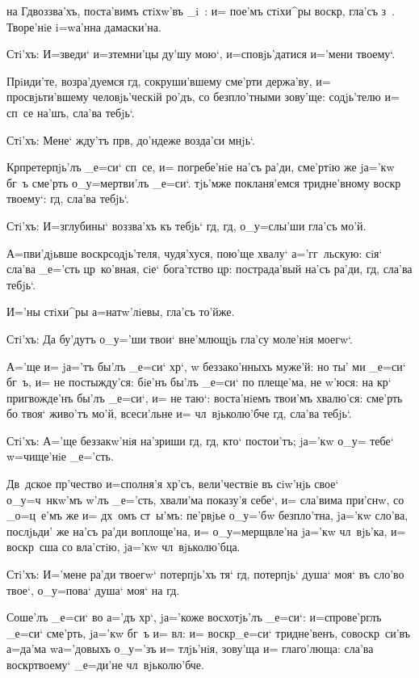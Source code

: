 
на Гд воззва'хъ, поста'вимъ стiхw'въ _i~: и= пое'мъ 
стiхи^ры воскр, гла'съ з~. Творе'нiе i=wа'нна 
дамаски'на.

Стi'хъ: И=зведи` и=з\ъ темни'цы ду'шу мою`, 
и=сповjь'датися и='мени твоему`.

Прiиди'те, возра'дуемся гд, сокруши'вшему сме'рти 
держа'ву, и= просвjьти'вшему человjь'ческiй ро'дъ, со 
безпло'тными зову'ще: содjь'телю и= сп~се на'шъ, сла'ва 
тебjь`.

Стi'хъ: Мене` жду'тъ прв, до'ндеже возда'си 
мнjь`.

Кр претерпjь'лъ _е=си` сп~се, и= погребе'нiе на'съ 
ра'ди, сме'ртiю же jа='кw бг~ъ сме'рть о_у=мертви'лъ 
_е=си`. тjь'мже покланя'емся тридне'вному воскр 
твоему`: гд, сла'ва тебjь`.

Стi'хъ: И=з\ъ глубины` воззва'хъ къ тебjь` гд, 
гд, о_у=слы'ши гла'съ мо'й.

А=п ви'дjьвше воскр содjь'теля, чудя'хуся, 
пою'ще хвалу` а='гг~льскую: сiя` сла'ва _е='сть 
цр~ко'вная, сiе` бога'тство цр: пострада'вый на'съ 
ра'ди, гд, сла'ва тебjь`.

И='ны стiхи^ры а=натw'лiевы, гла'съ то'йже.

Стi'хъ: Да бу'дутъ о_у='ши твои` вне'млющjь гла'су 
моле'нiя моегw`.

А='ще и= jа='тъ бы'лъ _е=си` хр`, w\т 
беззако'нныхъ муже'й: но ты' ми _е=си` бг~ъ, и= не 
постыжду'ся: бiе'нъ бы'лъ _е=си` по плеще'ма, не 
w'юся: на кр` пригвожде'нъ бы'лъ _е=си`, и= не 
таю`: воста'нiемъ твои'мъ хвалю'ся: сме'рть бо твоя` 
живо'тъ мо'й, всеси'льне и= чл~вjьколю'бче гд, сла'ва 
тебjь`.

Стi'хъ: А='ще беззакw'нiя на'зриши гд, гд, кто` 
постои'тъ; jа='кw о_у= тебе` w=чище'нiе _е='сть.

Дв~дское пр'чество и=сполня'я хр'съ, 
вели'чествiе въ сiw'нjь свое` о_у=ч~нкw'мъ w'лъ 
_е='сть, хвали'ма показу'я себе`, и= сла'вима при'снw, со 
_о=ц~е'мъ же и= дх~омъ ст~ы'мъ: пе'рвjье о_у='бw 
безпло'тна, jа='кw сло'ва, послjьди' же на'съ ра'ди 
воплоще'на, и= о_у=мерщвле'на jа='кw чл~вjь'ка, и= 
воскр~сша со вла'стiю, jа='кw чл~вjьколю'бца.

Стi'хъ: И='мене ра'ди твоегw` потерпjь'хъ тя` гд, 
потерпjь` душа` моя` въ сло'во твое`, о_у=пова` душа` 
моя` на гд.

Соше'лъ _е=си` во а='дъ хр`, jа='коже восхотjь'лъ 
_е=си`: и=спрове'рглъ _е=си` сме'рть, jа='кw бг~ъ и= 
вл: и= воскр _е=си` тридне'венъ, совоскр~си'въ 
а=да'ма w\т а='довыхъ о_у='зъ и= тлjь'нiя, зову'ща и= 
глаго'люща: сла'ва воскр твоему` _е=ди'не 
чл~вjьколю'бче.

